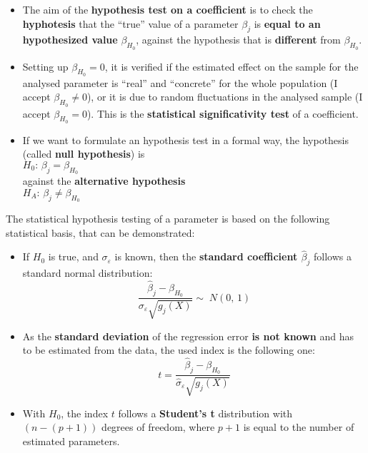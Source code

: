 
\begin{frame}
  \vspace*{.05cm}
  \begin{itemize}
    \item The aim of the \textbf{hypothesis test on a coefficient} is to check the \textbf{hyphotesis} that the ``true'' value of a parameter $ \beta_j $ is \textbf{equal to an hypothesized value} $ \beta_{H_0} $, against the hypothesis that is \textbf{different} from $ \beta_{H_0} $.
    \item Setting up $ \beta_{H_0} = 0 $, it is verified if the estimated effect on the sample for the analysed parameter is  ``real'' and ``concrete'' for the whole population (I accept $ \beta_{H_0} \neq 0 $), or it is due to random fluctuations in the analysed sample (I accept $ \beta_{H_0} = 0 $). This is the \textbf{statistical significativity test} of a coefficient.
    \item If we want to formulate an hypothesis test in a formal way, the hypothesis (called \textbf{null hypothesis}) is\\
    \vspace*{.15cm}
    \hspace*{1cm}$H_0:\,\beta_{j} = \beta_{H_0}$\\
    \vspace*{.15cm}
    against the \textbf{alternative hypothesis}\\
    \vspace*{.15cm}
    \hspace*{1cm}$H_{A}:\, \beta_{j}\neq \beta_{H_0}$
  \end{itemize}
\end{frame}

\begin{frame}
  The statistical hypothesis testing of a parameter is based on the following statistical basis, that can be demonstrated:
  \vspace*{-.15cm}
  \begin{itemize}
    \item If $ H_0 $ is true, and $ \sigma_\varepsilon $ is known, then the \textbf{standard coefficient {\boldmath $ \hat{\beta}_j $}} follows a standard normal distribution:
      $$ \frac{\hat{\beta}_j-\beta_{H_0}}{\sigma_{\varepsilon}\sqrt{g_j(X)}}\sim\;N(0,\,1) $$
    \item As the \textbf{standard deviation} of the regression error \textbf{is not known} and has to be estimated from the data, the used index is the following one:
      $$ t = \frac{\hat{\beta}_j-\beta_{H_0}}{\hat{\sigma}_{\varepsilon}\sqrt{g_j(X)}} $$
    \item With $ H_0 $, the index $ t$ follows a \textbf{Student's t} distribution with $ (n-(p+1)) $ degrees of freedom, where $ p + 1 $ is equal to the number of estimated parameters.
  \end{itemize}
\end{frame}

